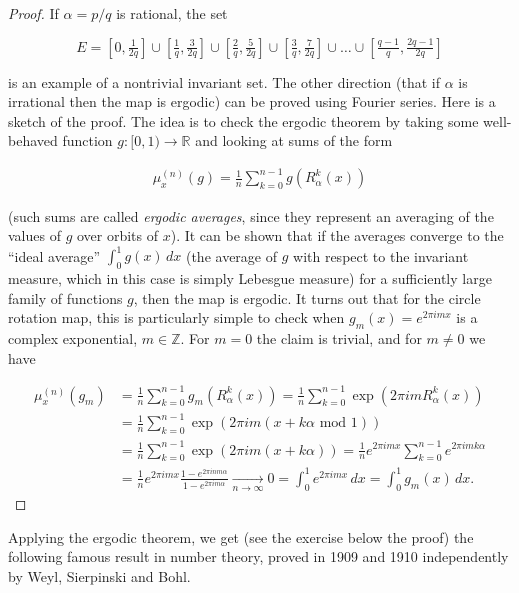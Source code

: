 \documentclass[11pt]{report}
\theoremstyle{plain}
\theoremstyle{definition}
\begin{document}
\begin{proof}
If $\alpha=p/q$ is rational, the set

\[
E = \left[0, \tfrac{1}{2q}\right]
\cup \left[\tfrac{1}{q}, \tfrac{3}{2q}\right]
\cup \left[\tfrac{2}{q}, \tfrac{5}{2q}\right]
\cup \left[\tfrac{3}{q}, \tfrac{7}{2q}\right]
\cup \ldots
\cup \left[\tfrac{q-1}{q}, \tfrac{2q-1}{2q}\right]
\]

is an example of a nontrivial invariant set. The
other direction (that if $\alpha$ is irrational then
the map is ergodic) can be proved using Fourier
series. Here is a sketch of the proof. The idea is to
check the ergodic theorem by taking some well-behaved
function $g:[0,1)\to\mathbb{R}$ and looking at sums
of the form

\begin{align*}
\mu_x^{(n)}(g) = \frac{1}{n} \sum_{k=0}^{n-1} g(R_\alpha^k(x))
\end{align*}

(such sums are called \emph{ergodic averages}, since they
represent an averaging of the values of $g$ over
orbits of $x$). It can be shown that if the averages
converge to the ``ideal average'' $\int_0^1 g(x)\,dx$
(the average of $g$ with respect to the invariant
measure, which in this case is simply Lebesgue
measure) for a sufficiently large family of functions
$g$, then the map is ergodic. It turns out that for
the circle rotation map, this is particularly simple
to check when $g_m(x)=e^{2\pi i m x}$ is a complex
exponential, $m\in\mathbb{Z}$. For $m=0$ the claim is
trivial, and for $m\neq 0$ we have

\begin{align*}
\mu_x^{(n)}(g_m) &=
\frac{1}{n} \sum_{k=0}^{n-1} g_m(R_\alpha^k(x)) =
\frac{1}{n} \sum_{k=0}^{n-1} \exp(2\pi i m R_\alpha^k(x)) \\ &=
\frac{1}{n} \sum_{k=0}^{n-1} \exp(2\pi i m (x+k\alpha \textrm{ mod }1)) \\
&=
\frac{1}{n} \sum_{k=0}^{n-1} \exp(2\pi i m (x+k\alpha))
=
\frac{1}{n} e^{2\pi i m x} \sum_{k=0}^{n-1} e^{2\pi i m k \alpha} \\
&=
\frac{1}{n} e^{2\pi i m x} \frac{1-e^{2\pi i n m \alpha}}{1-e^{2\pi i m \alpha}} \xrightarrow[n\to\infty]{}0=\int_0^1 e^{2\pi i m x}\,dx = \int_0^1 g_m(x)\,dx.
\end{align*}

\end{proof}

Applying the ergodic theorem, we get (see the
exercise below the proof) the following famous result
in number theory, proved in 1909 and 1910
independently by Weyl, Sierpinski and Bohl.
\end{document}
